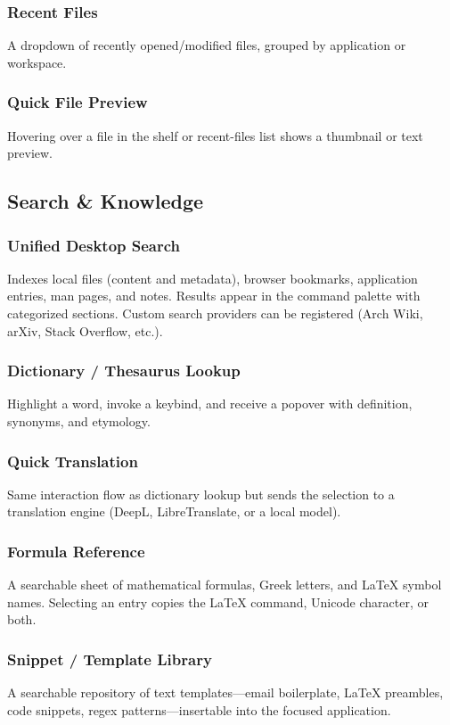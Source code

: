 \documentclass[11pt,a4paper]{article}
\begin{document}
\subsubsection{Recent Files}
A dropdown of recently opened/modified files, grouped by application or workspace.

\subsubsection{Quick File Preview}
Hovering over a file in the shelf or recent-files list shows a thumbnail or text preview.


\subsection{Search \& Knowledge}
\label{sec:features-search}

\subsubsection{Unified Desktop Search}
Indexes local files (content and metadata), browser bookmarks, application entries, man pages, and notes. Results appear in the command palette with categorized sections. Custom search providers can be registered (Arch Wiki, arXiv, Stack Overflow, etc.).

\subsubsection{Dictionary / Thesaurus Lookup}
Highlight a word, invoke a keybind, and receive a popover with definition, synonyms, and etymology.

\subsubsection{Quick Translation}
Same interaction flow as dictionary lookup but sends the selection to a translation engine (DeepL, LibreTranslate, or a local model).

\subsubsection{Formula Reference}
A searchable sheet of mathematical formulas, Greek letters, and \LaTeX{} symbol names. Selecting an entry copies the \LaTeX{} command, Unicode character, or both.

\subsubsection{Snippet / Template Library}
A searchable repository of text templates---email boilerplate, \LaTeX{} preambles, code snippets, regex patterns---insertable into the focused application.
\end{document}
